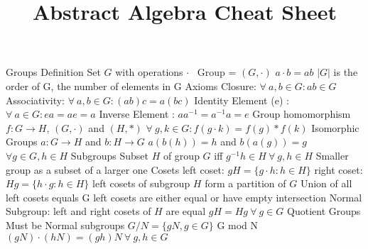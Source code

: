 \documentclass[14pt]{extarticle}
\title{Abstract Algebra Cheat Sheet}
\begin{document}
	\maketitle
	
	\begin{outline}		
		\1	Groups
			\2	Definition
				\3	Set $G$ with operations $\cdot$\
				\3	Group = $(G,\cdot)$
				\3	$a \cdot b = ab$
				\3	$|G|$ is the order of G, the number of elements in G
			\2	Axioms 
				\3	Closure:	$\forall~a,b \in G: ab \in G$
				\3	Associativity:	$\forall~a,b \in G: (ab)c = a(bc)$
				\3	Identity Element (e) :	$\forall~a \in G:	ea = ae = a$
				\3	Inverse Element :	$a a^{-1} = a^{-1}a = e$
			\2	Group homomorphism
				\3	$f : G \rightarrow H$, $(G,\cdot)$ and $(H,*)$
				\3	$\forall~g,k \in G : f(g \cdot k) = f(g) * f(k)$
				\3	Isomorphic Groups
					\4	$a: G \rightarrow H$ and $b: H \rightarrow G$
					\4	$a(b(h)) = h$ and $b(a(g)) = g$ $\forall g \in G,h \in H$
			\2	Subgroups
				\3	Subset $H$ of group $G$ iff $g^{-1}h \in H~\forall~g,h \in H$
				\3	Smaller group as a subset of a larger one
				\3	Cosets
					\4	left coset:	$gH = \{g \cdot h : h \in H\}$
					\4	right coset:	$Hg = \{h \cdot g : h \in H\}$
					\4	left cosets of subgroup $H$ form a partition of $G$
					\4	Union of all left cosets equals G
					\4	left cosets are either equal or have empty intersection
				\3	Normal Subgroup:	left and right cosets of $H$ are equal
					\4	$gH = Hg~\forall~g \in G$
			\2	Quotient Groups
				\3	Must be Normal subgroups
				\3	$G / N = \{gN, g \in G\}$
				\3	G mod N
				\3	$(gN) \cdot (hN) = (gh)N~\forall~g,h \in G$


\end{outline}
\end{document}
